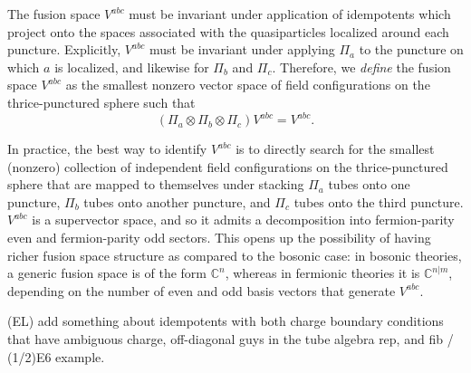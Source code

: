 \documentclass[12pt,a4paper]{article}
\newcommand{\tp}{\otimes}
\newcommand{\cc}{\mathbb{C}}
\newcommand\be            {\begin{equation}}
\newcommand\ee            {\end{equation}}
\newcommand{\fube}{\textbf{Tube}}
\newcommand{\fld}{\mathcal{F}} %
\newcommand{\ethan}[1]{{\color{amethyst}\footnotesize{(EL) #1}}}
\begin{document}
The fusion space $V^{abc}$ must be invariant under application of idempotents which project onto the spaces associated with the quasiparticles localized around each puncture. Explicitly, $V^{abc}$ must be invariant under applying $\Pi_a$ to the puncture on which $a$ is localized, and likewise for $\Pi_b$ and $\Pi_c$. 
Therefore, we {\it define} the fusion space $V^{abc}$ as the smallest nonzero vector space of field configurations on the thrice-punctured sphere such that 
\be (\Pi_a\tp \Pi_b \tp \Pi_c) V^{abc} = V^{abc}.\ee

In practice, the best way to identify $V^{abc}$ is to directly search for the smallest (nonzero) collection of independent field configurations on the thrice-punctured sphere that are mapped to themselves under stacking $\Pi_a$ tubes onto one puncture, $\Pi_b$ tubes onto another puncture, and $\Pi_c$ tubes onto the third puncture. $V^{abc}$ is a supervector space, and so it admits a decomposition into fermion-parity even and fermion-parity odd sectors. This opens up the possibility of having richer fusion space structure as compared to the bosonic case: in bosonic theories, a generic fusion space is of the form $\cc^n$, whereas in fermionic theories it is $\cc^{n|m}$, depending on the number of even and odd basis vectors that generate $V^{abc}$.

\ethan{add something about idempotents with both charge boundary conditions that have ambiguous charge, off-diagonal guys in the tube algebra rep, and fib / (1/2)E6 example.}
\end{document}
